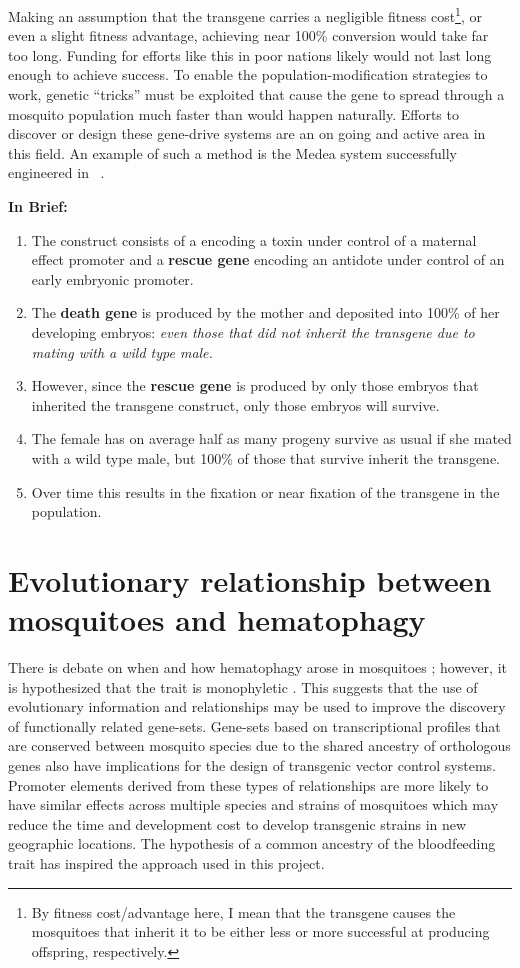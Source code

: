Making an assumption that the transgene carries a negligible fitness cost\footnote{By fitness cost/advantage here, I mean that the transgene
    causes the mosquitoes that inherit it to be either less or more
    successful at producing offspring, respectively.},
or even a slight fitness advantage, achieving near 100\% conversion would take far too long.
Funding for efforts like this in poor nations likely would not last long enough to achieve success.
To enable the \gls{population-modification} strategies to work, genetic ``tricks'' must be exploited that cause the gene to spread through a mosquito population much faster than would happen naturally.
Efforts to discover or design these \gls{gene-drive} systems are an on going and active area in this field.
An example of such a method is the Medea system successfully engineered in \Dm\ \cite{Ward2011}.


\textbf{In Brief:}
\begin{enumerate}
 \item The construct consists of a  encoding a toxin under control of a maternal effect promoter and a \textbf{rescue gene} encoding an antidote under control of an early embryonic promoter.
 \item The \textbf{death gene} is produced by the mother and deposited into 100\% of her developing embryos: \textit{even those that did not inherit the transgene due to mating with a wild type male.}
 \item However, since the \textbf{rescue gene} is produced by only those embryos that inherited the transgene construct, only those embryos will survive.
 \item The female has on average half as many progeny survive as usual if she mated with a wild type male, but 100\% of those that survive inherit the transgene.
 \item Over time this results in the fixation or near fixation of the transgene in the population.
\end{enumerate}


\section{Evolutionary relationship between mosquitoes and hematophagy}
There is debate on when and how \gls{hematophagy} arose in mosquitoes \cite{Rai1999a}; however, it is hypothesized that the trait is \gls{monophyletic} \cite{Borkent2004,Calvo2006}.
This suggests that the use of evolutionary information and relationships may be used to improve the discovery of functionally related gene-sets.
Gene-sets based on transcriptional profiles that are conserved between mosquito species due to the shared ancestry of orthologous genes also have implications for the design of transgenic vector control systems.
Promoter elements derived from these types of relationships are more likely to have similar effects across multiple species and strains of mosquitoes which may reduce the time and development cost to develop transgenic strains in new geographic locations.
The hypothesis of a common ancestry of the bloodfeeding trait has inspired the approach used in this project.



